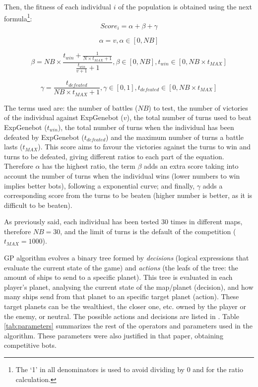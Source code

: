 \documentclass[runningheads,a4paper]{llncs}
\begin{document}
Then, the fitness of each individual $i$ of the population is obtained using the next formula\footnote{The 
`1' in all denominators is used to avoid dividing by 0 and for the ratio calculation.}:
\begin{equation}
Score_{i}=\alpha+\beta+\gamma\label{eq:score}
\end{equation}

\begin{equation}
\alpha=v,\alpha\in\left[0,NB\right]
\end{equation}

\begin{equation}
\beta=NB\times\frac{t_{win}+\frac{1}{N\times t_{MAX}+1}}{\frac{t_{win}}{v+1}+1},\beta\in\left[0,NB\right],t_{win}\in\left[0,NB\times t_{MAX}\right]
\end{equation}


\begin{equation}
\gamma=\frac{t_{defeated}}{NB\times t_{MAX}+1},\gamma\in\left[0,1\right],t_{defeated}\in\left[0,NB\times t_{MAX}\right]
\end{equation}

The terms used are: the number of battles ($NB$) to test, the number of
victories of the individual against ExpGenebot ($v$), the total number of
turns used to beat ExpGenebot ($t_{win}$), the total number of turns when
the individual has been defeated by ExpGenebot ($t_{defeated}$) and the
maximum number of turns a battle lasts ($t_{MAX}$). This score aims to
favour the victories against the turns to win and turns to be
defeated, giving different ratios to each part of the equation. 
Therefore $\alpha$ has the highest ratio, the term $\beta$ adds an extra score taking into account the number of turns when the individual wins (lower numbers to win implies better bots), following a exponential curve; and finally, $\gamma$ adds a corresponding score from the turns to be beaten 
(higher number is better, as it is difficult to be beaten). 

As previously said, each individual has been tested 30 times in different maps, therefore $NB=30$, and the limit of turns is the default of the competition ($t_{MAX}=1000$).

GP algorithm evolves a binary tree formed by {\em decisions} (logical expressions that evaluate the current state of the game) and {\em actions} (the leafs of the tree: the amount of ships to send to a specific planet). This tree is evaluated in each player's planet, analysing the current state of the map/planet (decision), and how many ships send from that planet to an specific target planet (action). These target planets can be the wealthiest, the closer one, etc. owned by the player or the enemy, or neutral. The possible actions and decisions are listed in \cite{EvoStar2014:GPBot:anon}. Table \ref{tab:parameters} summarizes the rest of the operators and parameters used in the algorithm. These parameters were also justified in that paper, obtaining competitive bots.
\end{document}
